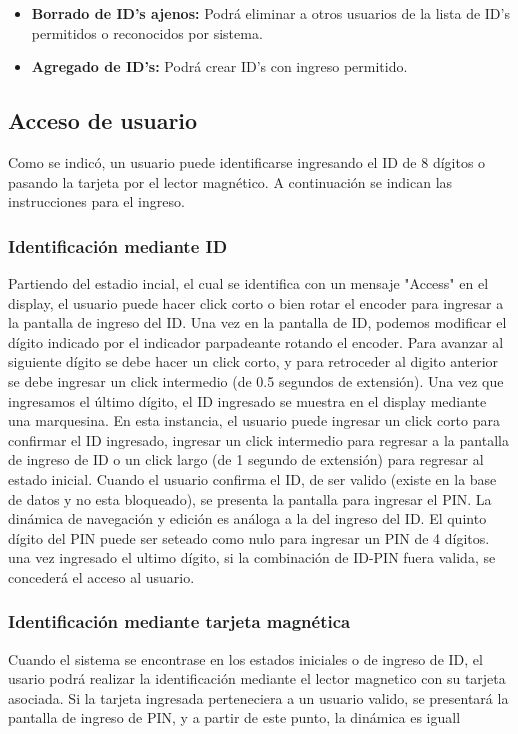 \documentclass[10pt,a4paper]{article}
\begin{document}
\begin{itemize}
\item \textbf{Borrado de ID's ajenos: } Podrá eliminar a otros usuarios de la lista de ID's permitidos o reconocidos por sistema.
\item \textbf{Agregado de ID's: } Podrá crear ID's con ingreso permitido.

\end{itemize}

\subsection{Acceso de usuario}
Como se indicó, un usuario puede identificarse ingresando el ID de 8 dígitos o pasando la tarjeta por el lector magnético. A continuación se indican las instrucciones para el ingreso.
\subsubsection{Identificación mediante ID}
Partiendo del estadio incial, el cual se identifica con un mensaje "Access" en el display, el usuario puede hacer click corto o bien rotar el encoder para ingresar a la pantalla de ingreso del ID. Una vez en la pantalla de ID, podemos modificar el dígito indicado por el indicador parpadeante rotando el encoder. Para avanzar al siguiente dígito se debe hacer un click corto, y para retroceder al digito anterior se debe ingresar un click intermedio (de 0.5 segundos de extensión). Una vez que ingresamos el último dígito, el ID ingresado se muestra en el display mediante una marquesina. En esta instancia, el usuario puede ingresar un click corto para confirmar el ID ingresado, ingresar un click intermedio para regresar a la pantalla de ingreso de ID o un click largo (de 1 segundo de extensión) para regresar al estado inicial. Cuando el usuario confirma el ID, de ser valido (existe en la base de datos y no esta bloqueado), se presenta la pantalla para ingresar el PIN. La dinámica de navegación y edición es análoga a la del ingreso del ID. El quinto dígito del PIN puede ser seteado como nulo para ingresar un PIN de 4 dígitos. una vez ingresado el ultimo dígito, si la combinación de ID-PIN fuera valida, se concederá el acceso al usuario. 

\subsubsection{Identificación mediante tarjeta magnética}
Cuando el sistema se encontrase en los estados iniciales o de ingreso de ID, el usario podrá realizar la identificación mediante el lector magnetico con su tarjeta asociada. Si la tarjeta ingresada perteneciera a un usuario valido, se presentará la pantalla de ingreso de PIN, y a partir de este punto, la dinámica es iguall 
\end{document}

